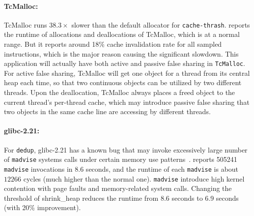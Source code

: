 
\paragraph{TcMalloc:}
TcMalloc runs $38.3\times$ slower than the default allocator for \texttt{cache-thrash}. \MP{} reports the runtime of allocations and deallocations of TcMalloc, which is at a normal range. But it reports around 18\% cache invalidation rate for all sampled instructions, which is the major reason causing the significant slowdown. This application will actually have both active and passive false sharing in \texttt{TcMalloc}. 
For active false sharing, TcMalloc will get one object for a thread from its central heap each time, so that two continuous objects can be utilized by two different threads. Upon the deallocation, TcMalloc always places a freed object to the current thread's per-thread cache, which may introduce passive false sharing that two objects in the same cache line are accessing by different threads. 

\paragraph{glibc-2.21:}  For \texttt{dedup}, glibc-2.21 has a known bug that may invoke excessively large number of \texttt{madvise} systems calls under certain memory use patterns~\cite{madvise}. \MP{} reports 505241 \texttt{madvise} invocations in 8.6 seconds, and the runtime of each \texttt{madvise} is about $12266$ cycles (much higher than the normal one). \texttt{madvise} introduce high kernel contention with page faults and memory-related system calls. Changing the threshold of shrink\_heap reduces the runtime from 8.6 seconds to 6.9 seconds (with 20\% improvement).



